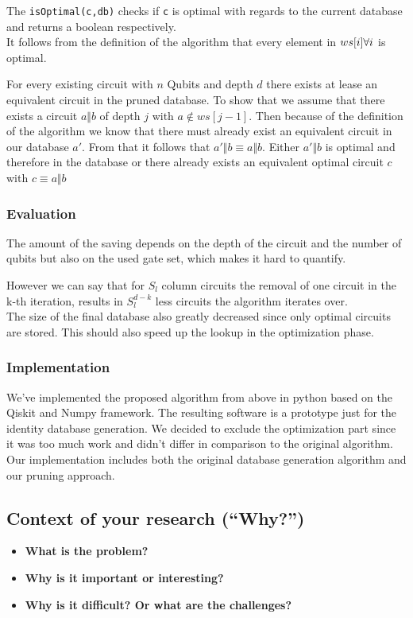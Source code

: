 The \texttt{isOptimal(c,db)} checks if \texttt{c} is optimal with regards to the current database  and returns a boolean respectively.\\

It follows from the definition of the algorithm that every element in $ws[i]\space\forall i$ is optimal. 

For every existing circuit with $n$ Qubits and depth $d$ there exists at lease an equivalent circuit in the pruned database. To show that we assume that there exists a circuit $a\Vert b$ of depth $j$ with $a\not\in ws[j-1]$. Then because of the definition of the algorithm we know that there must already exist an equivalent circuit in our database $a'$. From that it follows that $a'\Vert b\equiv a\Vert b$. Either $a'\Vert b$ is optimal and therefore in the database or there already exists an equivalent optimal circuit $c$ with $c\equiv a\Vert b$

\subsubsection{Evaluation}
The amount of the saving depends on the depth of the circuit and the number of qubits but also on the used gate set, which makes it hard to quantify. 

However we can say that for $S_l$ column circuits the removal of one circuit in the k-th iteration, results in $S_l^{d-k}$ less circuits the algorithm iterates over.\\

The size of the final database also greatly decreased since only optimal circuits are stored. This should also speed up the lookup in the optimization phase.

\subsubsection{Implementation}
We've implemented the proposed algorithm from above in python based on the Qiskit and Numpy framework. The resulting software is a prototype just for the identity database generation. We decided to exclude the optimization part since it was too much work and didn't differ in comparison to the original algorithm. Our implementation includes both the original database generation algorithm and our pruning approach.

\subsection{Context of your research (``Why?'')}
\begin{itemize}
  \item \textbf{What is the problem?}
  \item \textbf{Why is it important or interesting?}
  \item \textbf{Why is it difficult? Or what are the challenges?}
\end{itemize}

